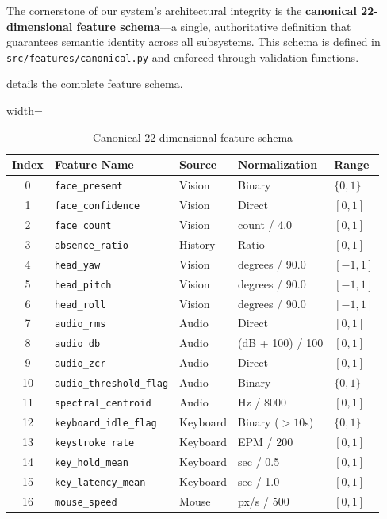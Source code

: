 \documentclass{article}
\begin{document}
The cornerstone of our system's architectural integrity is the \textbf{canonical 22-dimensional feature schema}---a single, authoritative definition that guarantees semantic identity across all subsystems. This schema is defined in \texttt{src/features/canonical.py} and enforced through validation functions.

 details the complete feature schema.

\begin{table}[H]
\centering
\caption{Canonical 22-dimensional feature schema}
\label{tab:canonical_features}
\begin{adjustbox}{width=\textwidth}
\begin{tabular}{c l l l l}
\toprule
\textbf{Index} & \textbf{Feature Name} & \textbf{Source} & \textbf{Normalization} & \textbf{Range} \\
\midrule
0 & \texttt{face\_present} & Vision & Binary & $\{0, 1\}$ \\
1 & \texttt{face\_confidence} & Vision & Direct & $[0, 1]$ \\
2 & \texttt{face\_count} & Vision & count / 4.0 & $[0, 1]$ \\
3 & \texttt{absence\_ratio} & History & Ratio & $[0, 1]$ \\
4 & \texttt{head\_yaw} & Vision & degrees / 90.0 & $[-1, 1]$ \\
5 & \texttt{head\_pitch} & Vision & degrees / 90.0 & $[-1, 1]$ \\
6 & \texttt{head\_roll} & Vision & degrees / 90.0 & $[-1, 1]$ \\
7 & \texttt{audio\_rms} & Audio & Direct & $[0, 1]$ \\
8 & \texttt{audio\_db} & Audio & (dB + 100) / 100 & $[0, 1]$ \\
9 & \texttt{audio\_zcr} & Audio & Direct & $[0, 1]$ \\
10 & \texttt{audio\_threshold\_flag} & Audio & Binary & $\{0, 1\}$ \\
11 & \texttt{spectral\_centroid} & Audio & Hz / 8000 & $[0, 1]$ \\
12 & \texttt{keyboard\_idle\_flag} & Keyboard & Binary ($>10$s) & $\{0, 1\}$ \\
13 & \texttt{keystroke\_rate} & Keyboard & EPM / 200 & $[0, 1]$ \\
14 & \texttt{key\_hold\_mean} & Keyboard & sec / 0.5 & $[0, 1]$ \\
15 & \texttt{key\_latency\_mean} & Keyboard & sec / 1.0 & $[0, 1]$ \\
16 & \texttt{mouse\_speed} & Mouse & px/s / 500 & $[0, 1]$ \\

\end{tabular}
\end{adjustbox}
\end{table}
\end{document}
